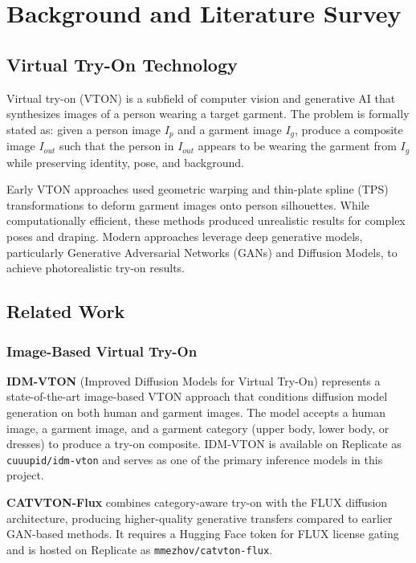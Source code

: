 \chapter{Background and Literature Survey}
\label{ch:background}

\section{Virtual Try-On Technology}
\label{sec:vton-technology}

Virtual try-on (VTON) is a subfield of computer vision and generative AI that synthesizes images of a person wearing a target garment. The problem is formally stated as: given a person image $I_p$ and a garment image $I_g$, produce a composite image $I_{out}$ such that the person in $I_{out}$ appears to be wearing the garment from $I_g$ while preserving identity, pose, and background.

Early VTON approaches used geometric warping and thin-plate spline (TPS) transformations to deform garment images onto person silhouettes. While computationally efficient, these methods produced unrealistic results for complex poses and draping. Modern approaches leverage deep generative models, particularly Generative Adversarial Networks (GANs) and Diffusion Models, to achieve photorealistic try-on results.

\section{Related Work}
\label{sec:related-work}

\subsection{Image-Based Virtual Try-On}

\textbf{IDM-VTON} (Improved Diffusion Models for Virtual Try-On) represents a state-of-the-art image-based VTON approach that conditions diffusion model generation on both human and garment images. The model accepts a human image, a garment image, and a garment category (upper body, lower body, or dresses) to produce a try-on composite. IDM-VTON is available on Replicate as \texttt{cuuupid/idm-vton} and serves as one of the primary inference models in this project.

\textbf{CATVTON-Flux} combines category-aware try-on with the FLUX diffusion architecture, producing higher-quality generative transfers compared to earlier GAN-based methods. It requires a Hugging Face token for FLUX license gating and is hosted on Replicate as \texttt{mmezhov/catvton-flux}.


